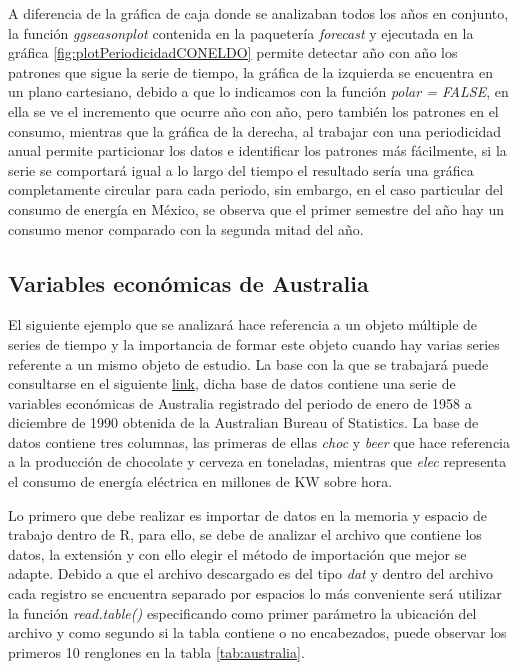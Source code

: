 \documentclass[
  spanish,
]{book}
\theoremstyle{remark}
\begin{document}
A diferencia de la gráfica de caja donde se analizaban todos los años en conjunto, la función \emph{ggseasonplot} contenida en la paquetería \emph{forecast} y ejecutada en la gráfica \ref{fig:plotPeriodicidadCONELDO} permite detectar año con año los patrones que sigue la serie de tiempo, la gráfica de la izquierda se encuentra en un plano cartesiano, debido a que lo indicamos con la función \emph{polar = FALSE}, en ella se ve el incremento que ocurre año con año, pero también los patrones en el consumo, mientras que la gráfica de la derecha, al trabajar con una periodicidad anual permite particionar los datos e identificar los patrones más fácilmente, si la serie se comportará igual a lo largo del tiempo el resultado sería una gráfica completamente circular para cada periodo, sin embargo, en el caso particular del consumo de energía en México, se observa que el primer semestre del año hay un consumo menor comparado con la segunda mitad del año.

\hypertarget{variables-econuxf3micas-de-australia}{%
\subsection{Variables económicas de Australia}\label{variables-econuxf3micas-de-australia}}

El siguiente ejemplo que se analizará hace referencia a un objeto múltiple de series de tiempo y la importancia de formar este objeto cuando hay varias series referente a un mismo objeto de estudio. La base con la que se trabajará puede consultarse en el siguiente \href{https://raw.githubusercontent.com/omarr667/TimeSeries/main/Databases/cbe.dat.txt}{link}, dicha base de datos contiene una serie de variables económicas de Australia registrado del periodo de enero de 1958 a diciembre de 1990 obtenida de la Australian Bureau of Statistics. La base de datos contiene tres columnas, las primeras de ellas \emph{choc} y \emph{beer} que hace referencia a la producción de chocolate y cerveza en toneladas, mientras que \emph{elec} representa el consumo de energía eléctrica en millones de KW sobre hora.

Lo primero que debe realizar es importar de datos en la memoria y espacio de trabajo dentro de R, para ello, se debe de analizar el archivo que contiene los datos, la extensión y con ello elegir el método de importación que mejor se adapte. Debido a que el archivo descargado es del tipo \emph{dat} y dentro del archivo cada registro se encuentra separado por espacios lo más conveniente será utilizar la función \emph{read.table()} especificando como primer parámetro la ubicación del archivo y como segundo si la tabla contiene o no encabezados, puede observar los primeros 10 renglones en la tabla \ref{tab:australia}.
\end{document}
